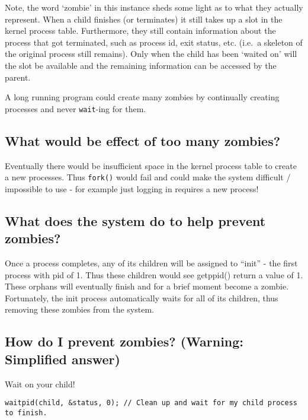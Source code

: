 Note, the word `zombie' in this instance sheds some light as to what
they actually represent. When a child finishes (or terminates) it still
takes up a slot in the kernel process table. Furthermore, they still
contain information about the process that got terminated, such as
process id, exit status, etc. (i.e.~a skeleton of the original process
still remains). Only when the child has been `waited on' will the slot
be available and the remaining information can be accessed by the
parent.

A long running program could create many zombies by continually creating
processes and never \texttt{wait}-ing for them.

\subsection{What would be effect of too many
zombies?}\label{what-would-be-effect-of-too-many-zombies}

Eventually there would be insufficient space in the kernel process table
to create a new processes. Thus \texttt{fork()} would fail and could
make the system difficult / impossible to use - for example just logging
in requires a new process!

\subsection{What does the system do to help prevent
zombies?}\label{what-does-the-system-do-to-help-prevent-zombies}

Once a process completes, any of its children will be assigned to
``init'' - the first process with pid of 1. Thus these children would
see getppid() return a value of 1. These orphans will eventually finish
and for a brief moment become a zombie. Fortunately, the init process
automatically waits for all of its children, thus removing these zombies
from the system.

\subsection{How do I prevent zombies? (Warning: Simplified
answer)}\label{how-do-i-prevent-zombies-warning-simplified-answer}

Wait on your child!

\begin{verbatim}
waitpid(child, &status, 0); // Clean up and wait for my child process to finish.
\end{verbatim}

